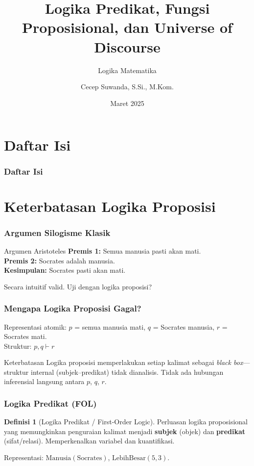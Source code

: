 \documentclass[handout]{beamer}
\subtitle[Logika Matematika]{Logika Matematika}
\title[Logika Predikat]{Logika Predikat, Fungsi Proposisional, dan Universe of Discourse}
\author{Cecep Suwanda, S.Si., M.Kom.}
\date{Maret 2025}
\institute{Universitas Bale Bandung}
\theoremstyle{definition}
\newtheorem{definisi}[theorem]{Definisi}
\theoremstyle{example}
\begin{document}
\maketitle

\section*{Daftar Isi}
\begin{frame}
\frametitle{Daftar Isi}
\tableofcontents
\end{frame}

\section{Keterbatasan Logika Proposisi}

\begin{frame}
\frametitle{Argumen Silogisme Klasik}
\begin{block}{Argumen Aristoteles}
\textbf{Premis 1:} Semua manusia pasti akan mati.\\
\textbf{Premis 2:} Socrates adalah manusia.\\
\textbf{Kesimpulan:} Socrates pasti akan mati.
\end{block}
Secara intuitif valid. Uji dengan logika proposisi?
\end{frame}

\begin{frame}
\frametitle{Mengapa Logika Proposisi Gagal?}
Representasi atomik: $p$ = semua manusia mati, $q$ = Socrates manusia, $r$ = Socrates mati.\\
Struktur: $p, q \vdash r$
\begin{block}{Keterbatasan}
Logika proposisi memperlakukan setiap kalimat sebagai \textit{black box}---struktur internal (subjek--predikat) tidak dianalisis. Tidak ada hubungan inferensial langsung antara $p$, $q$, $r$.
\end{block}
\end{frame}

\begin{frame}
\frametitle{Logika Predikat (FOL)}
\begin{definisi}[Logika Predikat / First-Order Logic]
Perluasan logika proposisional yang memungkinkan penguraian kalimat menjadi \textbf{subjek} (objek) dan \textbf{predikat} (sifat/relasi). Memperkenalkan variabel dan kuantifikasi.
\end{definisi}
Representasi: $\text{Manusia}(\text{Socrates})$, $\text{LebihBesar}(5, 3)$.
\end{frame}
\end{document}
